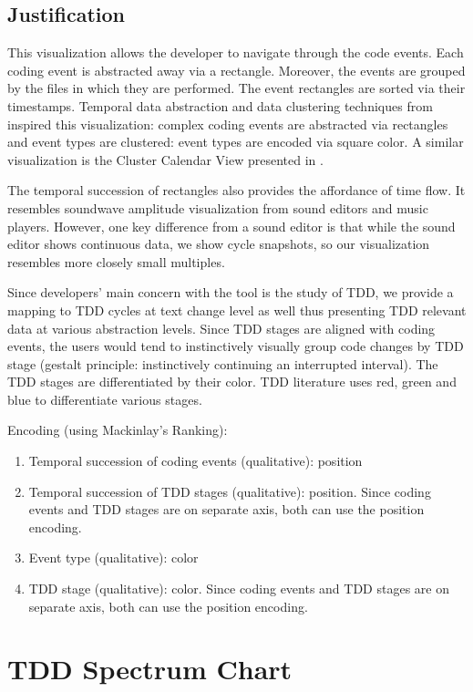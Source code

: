 \documentclass[journal]{vgtc}                %
\begin{document}
\subsection{Justification}

This visualization allows the developer to navigate through the code events.
Each coding event is abstracted away via a rectangle. Moreover, the events are grouped by the files in which they are performed. The event rectangles are sorted via their timestamps. Temporal data abstraction and data clustering techniques from \cite{one} inspired this visualization: complex coding events are abstracted via rectangles and event types are clustered: event types are encoded via square color. A similar visualization is the Cluster Calendar View presented in \cite{one}.

The temporal succession of rectangles also provides the affordance of time flow. It resembles soundwave amplitude visualization from sound editors and music players.
However, one key difference from a sound editor is that while the sound editor shows continuous data, we show cycle snapshots, so our visualization resembles more closely small multiples.

Since developers' main concern with the tool is the study of TDD, we provide a mapping to TDD cycles at text change level as well thus presenting TDD relevant data at various abstraction levels. 
Since TDD stages are aligned with coding events, the users would tend to instinctively visually group code changes by TDD stage (gestalt principle: instinctively continuing an interrupted interval).
The TDD stages are differentiated by their color. TDD literature uses red, green and blue to differentiate various stages.

Encoding (using Mackinlay's Ranking):
\begin{enumerate}
	\item Temporal succession of coding events (qualitative): position
	\item Temporal succession of TDD stages (qualitative): position. Since coding events and TDD stages are on separate axis, both can use the position encoding.
	\item Event type (qualitative): color
	\item TDD stage (qualitative): color. Since coding events and TDD stages are on separate axis, both can use the position encoding.
\end{enumerate}

\section{TDD Spectrum Chart}
\label{sec:spectrum}
\end{document}
